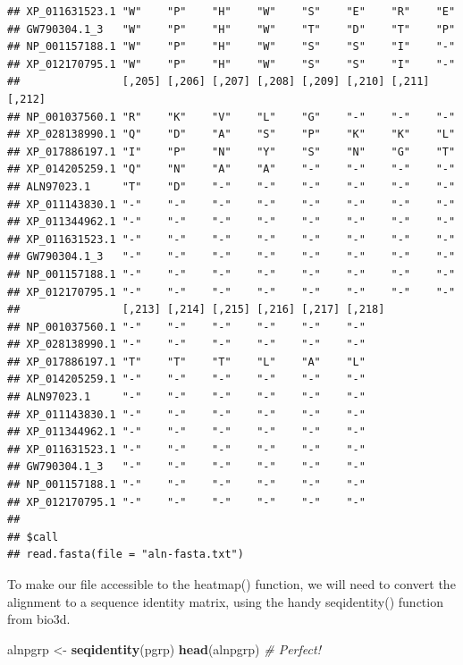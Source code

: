 \documentclass[]{article}
\newenvironment{Shaded}{\begin{snugshade}}{\end{snugshade}}
\newcommand{\KeywordTok}[1]{\textcolor[rgb]{0.13,0.29,0.53}{\textbf{#1}}}
\newcommand{\StringTok}[1]{\textcolor[rgb]{0.31,0.60,0.02}{#1}}
\newcommand{\CommentTok}[1]{\textcolor[rgb]{0.56,0.35,0.01}{\textit{#1}}}
\newcommand{\NormalTok}[1]{#1}
\begin{document}
\begin{verbatim}
## XP_011631523.1 "W"    "P"    "H"    "W"    "S"    "E"    "R"    "E"   
## GW790304.1_3   "W"    "P"    "H"    "W"    "T"    "D"    "T"    "P"   
## NP_001157188.1 "W"    "P"    "H"    "W"    "S"    "S"    "I"    "-"   
## XP_012170795.1 "W"    "P"    "H"    "W"    "S"    "S"    "I"    "-"   
##                [,205] [,206] [,207] [,208] [,209] [,210] [,211] [,212]
## NP_001037560.1 "R"    "K"    "V"    "L"    "G"    "-"    "-"    "-"   
## XP_028138990.1 "Q"    "D"    "A"    "S"    "P"    "K"    "K"    "L"   
## XP_017886197.1 "I"    "P"    "N"    "Y"    "S"    "N"    "G"    "T"   
## XP_014205259.1 "Q"    "N"    "A"    "A"    "-"    "-"    "-"    "-"   
## ALN97023.1     "T"    "D"    "-"    "-"    "-"    "-"    "-"    "-"   
## XP_011143830.1 "-"    "-"    "-"    "-"    "-"    "-"    "-"    "-"   
## XP_011344962.1 "-"    "-"    "-"    "-"    "-"    "-"    "-"    "-"   
## XP_011631523.1 "-"    "-"    "-"    "-"    "-"    "-"    "-"    "-"   
## GW790304.1_3   "-"    "-"    "-"    "-"    "-"    "-"    "-"    "-"   
## NP_001157188.1 "-"    "-"    "-"    "-"    "-"    "-"    "-"    "-"   
## XP_012170795.1 "-"    "-"    "-"    "-"    "-"    "-"    "-"    "-"   
##                [,213] [,214] [,215] [,216] [,217] [,218]
## NP_001037560.1 "-"    "-"    "-"    "-"    "-"    "-"   
## XP_028138990.1 "-"    "-"    "-"    "-"    "-"    "-"   
## XP_017886197.1 "T"    "T"    "T"    "L"    "A"    "L"   
## XP_014205259.1 "-"    "-"    "-"    "-"    "-"    "-"   
## ALN97023.1     "-"    "-"    "-"    "-"    "-"    "-"   
## XP_011143830.1 "-"    "-"    "-"    "-"    "-"    "-"   
## XP_011344962.1 "-"    "-"    "-"    "-"    "-"    "-"   
## XP_011631523.1 "-"    "-"    "-"    "-"    "-"    "-"   
## GW790304.1_3   "-"    "-"    "-"    "-"    "-"    "-"   
## NP_001157188.1 "-"    "-"    "-"    "-"    "-"    "-"   
## XP_012170795.1 "-"    "-"    "-"    "-"    "-"    "-"   
## 
## $call
## read.fasta(file = "aln-fasta.txt")
\end{verbatim}

To make our file accessible to the heatmap() function, we will need to
convert the alignment to a sequence identity matrix, using the handy
seqidentity() function from bio3d.

\begin{Shaded}
\begin{Highlighting}[]
\NormalTok{alnpgrp <-}\StringTok{ }\KeywordTok{seqidentity}\NormalTok{(pgrp)}
\KeywordTok{head}\NormalTok{(alnpgrp) }\CommentTok{# Perfect!}
\end{Highlighting}
\end{Shaded}
\end{document}
